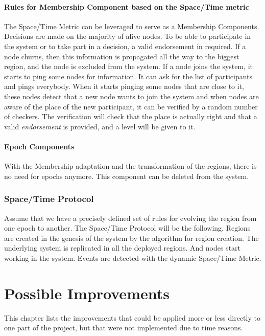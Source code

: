 \documentclass[a4paper,11pt,oneside]{report}
\begin{document}
\subsubsection{Rules for Membership Component based on the Space/Time metric}
The Space/Time Metric can be leveraged to serve as a Membership Components.
Decisions are made on the majority of alive nodes. To be able to participate in
the system or to take part in a decision, a valid endorsement in required. If a
node churns, then this information is propagated all the way to the
biggest region, and the node is excluded from the system.  If a node joins the
system, it starts to ping some nodes for information. It can ask for the list
of participants and pings everybody. When it starts pinging some nodes that are
close to it, these nodes detect that a new node wants to join the system and
when nodes are aware of the place of the new participant, it can be verified by
a random number of checkers. The verification will check that the place is
actually right and that a valid \textit{endorsement} is provided, and a level
will be given to it. 

\subsubsection{Epoch Components}
With the Membership adaptation and the transformation of the regions, there is
no need for epochs anymore. This component can be deleted from the system. 


\subsection{Space/Time Protocol}
Assume that we have a precisely defined set of rules for evolving the region
from one epoch to another.  The Space/Time Protocol will be the following.
Regions are created in the genesis of the system by the algorithm for region
creation. The underlying system is replicated in all the deployed regions. And
nodes start working in the system. Events are detected with the dynamic
Space/Time Metric. 

\chapter{Possible Improvements}


This chapter lists the improvements that could be applied more or less directly
to one part of the project, but that were not implemented due to time reasons. 
\end{document}
